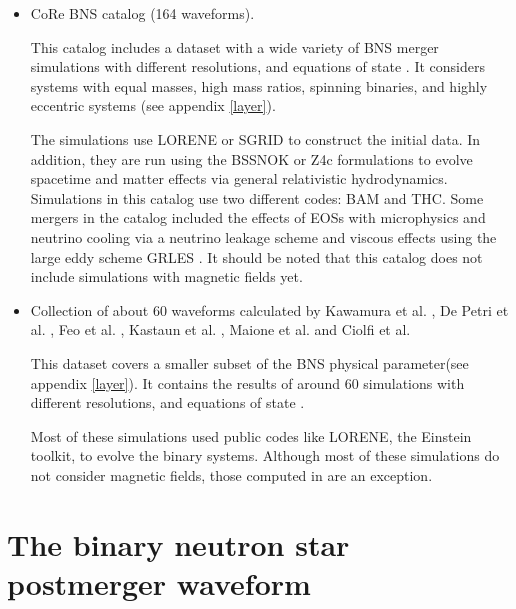 \begin{itemize}[leftmargin=*]

\item CoRe BNS catalog (164 waveforms).

This catalog includes a dataset with a wide variety of BNS merger simulations with different resolutions, and equations of state \cite{Banik_2014,Steiner:2012rk,PhysRevD.79.124032}. It considers systems with equal masses, high mass ratios, spinning binaries, and highly eccentric systems (see appendix \ref{layer}).

The simulations use LORENE or SGRID to construct the initial data. In addition, they are run using the BSSNOK \cite{PhysRevD.52.5428,1987PThPS..90....1N,Bernuzzi_2010} or Z4c \cite{Ruiz_2011,Weyhausen_2012,Hilditch_2013} formulations to evolve spacetime and matter effects via general relativistic hydrodynamics. Simulations in this catalog use two different codes: BAM and THC. Some mergers in the catalog included the effects of EOSs with microphysics and neutrino cooling via a neutrino leakage scheme and viscous effects using the large eddy scheme GRLES \cite{Radice_2017}. It should be noted that this catalog does not include simulations with magnetic fields yet.

\item Collection of about 60 waveforms calculated by Kawamura et al. \cite{Kawamura:2016nmk}, De Petri et al. \cite{DePietri:2018tpx,DePietri:2015lya}, Feo et al. \cite{Feo:2016cbs}, Kastaun et al. \cite{Kastaun:2016elu}, Maione et al. \cite{Maione:2016zqz,Maione:2017aux} and Ciolfi et al. \cite{Ciolfi:2017uak}

This dataset covers a smaller subset of the BNS physical parameter(see appendix \ref{layer}). It contains the results of around 60 simulations with different resolutions, and equations of state \cite{PhysRevC.82.015806,PhysRevC.83.035802,PhysRevC.58.1804,PhysRevD.79.124032,PhysRevLett.67.2414,PhysRevC.52.2072}.

Most of these simulations used public codes like LORENE, the Einstein toolkit, to evolve the binary systems. Although most of these simulations do not consider magnetic fields, those computed in \cite{Kawamura:2016nmk,Ciolfi:2017uak} are an exception. 

\end{itemize}



\section{The binary neutron star postmerger waveform}

